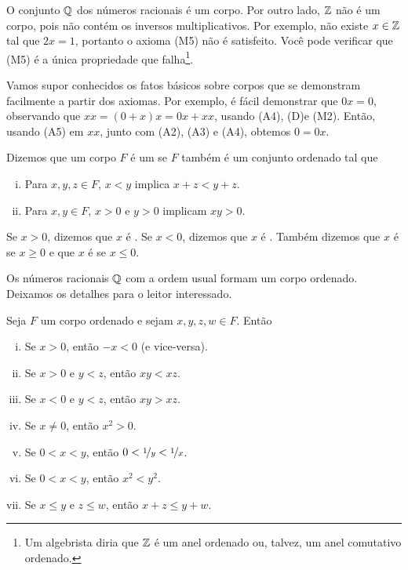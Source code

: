 \begin{example}
O conjunto ${\mathbb{Q}}$ dos números racionais é um corpo. Por outro lado, ${\mathbb{Z}}$ não é um
corpo, pois não contém os inversos multiplicativos. Por exemplo, não existe
$x \in {\mathbb{Z}}$ tal que $2x = 1$, portanto o axioma (M5) não é satisfeito. Você
pode verificar que (M5) é a única propriedade que falha\footnote{Um algebrista diria que ${\mathbb{Z}}$ é um anel ordenado ou, talvez, um anel comutativo ordenado.}.
\end{example}

Vamos supor conhecidos os fatos básicos sobre corpos que se demonstram
facilmente a partir dos axiomas. Por exemplo, é fácil demonstrar que $0x = 0$,
observando que $xx = (0+x)x = 0x+xx$, usando (A4), (D)\@ e (M2). Então,
usando (A5) em $xx$, junto com (A2), (A3) e (A4), obtemos $0 = 0x$.

\begin{defn}
Dizemos que um corpo $F$ é um \emph{} se
$F$ também é um conjunto ordenado tal que
\begin{enumerate}[(i)]
\item \label{defn:ordfield:i} Para $x,y,z \in F$, $x < y$ implica $x+z <
y+z$.
\item \label{defn:ordfield:ii} Para $x,y \in F$, $x > 0$ e $y > 0$
implicam $xy > 0$.
\end{enumerate}
Se $x > 0$, dizemos que $x$ é \emph{}.
Se $x < 0$, dizemos que $x$ é \emph{}.
Também dizemos que $x$ é \emph{} se $x \geq 0$
e que $x$ é \emph{} se $x \leq 0$.
\end{defn}

Os números racionais ${\mathbb{Q}}$ com a ordem usual formam um corpo ordenado.
Deixamos os detalhes para o leitor interessado.

\begin{prop} \label{prop:bordfield}
Seja $F$ um corpo ordenado e sejam $x,y,z,w \in F$. Então
\begin{enumerate}[(i)]
\item \label{prop:bordfield:i} Se $x > 0$, então $-x < 0$ (e vice-versa).
\item \label{prop:bordfield:ii} Se $x > 0$ e $y < z$, então $xy < xz$.
\item \label{prop:bordfield:iii} Se $x < 0$ e $y < z$, então $xy > xz$.
\item \label{prop:bordfield:iv} Se $x \neq 0$, então $x^2 > 0$.
\item \label{prop:bordfield:v} Se $0 < x < y$, então $0 < \nicefrac{1}{y} < \nicefrac{1}{x}$.
\item \label{prop:bordfield:vi} Se $0 < x < y$, então $x^2 < y^2$.
\item \label{prop:bordfield:vii} Se $x \leq y$ e $z \leq w$, então $x + z \leq y + w$.
\end{enumerate}
\end{prop}

